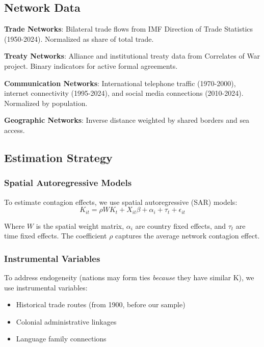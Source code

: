 \documentclass[12pt,a4paper]{article}
\begin{document}
\subsection{Network Data}

\textbf{Trade Networks}: Bilateral trade flows from IMF Direction of Trade Statistics (1950-2024). Normalized as share of total trade.

\textbf{Treaty Networks}: Alliance and institutional treaty data from Correlates of War project. Binary indicators for active formal agreements.

\textbf{Communication Networks}: International telephone traffic (1970-2000), internet connectivity (1995-2024), and social media connections (2010-2024). Normalized by population.

\textbf{Geographic Networks}: Inverse distance weighted by shared borders and sea access.

\subsection{Estimation Strategy}

\subsubsection{Spatial Autoregressive Models}

To estimate contagion effects, we use spatial autoregressive (SAR) models:
\begin{equation}
K_{it} = \rho W K_{t} + X_{it}\beta + \alpha_i + \tau_t + \epsilon_{it}
\end{equation}

Where $W$ is the spatial weight matrix, $\alpha_i$ are country fixed effects, and $\tau_t$ are time fixed effects. The coefficient $\rho$ captures the average network contagion effect.

\subsubsection{Instrumental Variables}

To address endogeneity (nations may form ties \textit{because} they have similar K), we use instrumental variables:
\begin{itemize}
    \item Historical trade routes (from 1900, before our sample)
    \item Colonial administrative linkages
    \item Language family connections
\end{itemize}
\end{document}
